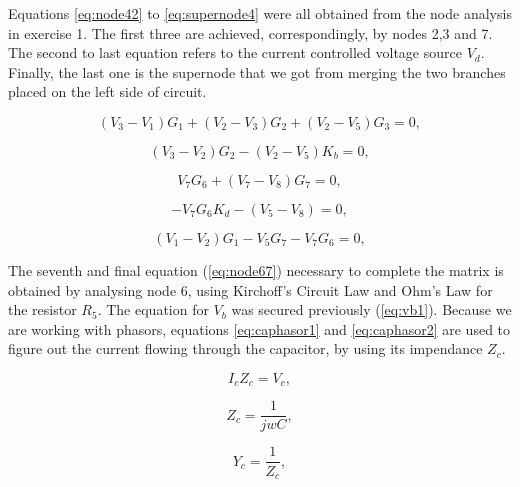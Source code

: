 Equations \ref{eq:node42} to \ref{eq:supernode4} were all obtained from the node analysis in exercise 1. The first three are achieved, correspondingly, by nodes 2,3 and 7. The second to last equation refers to the current controlled voltage source $V_d$. Finally, the last one is the supernode that we got from merging the two branches placed on the left side of circuit.

\begin{equation}
  (V_{3} - V_{1})G_{1} + (V_{2} - V_{3})G_{2} + (V_{2} - V_{5})G_{3}= 0,
  \label{eq:node42}
\end{equation}

\begin{equation}
  (V_{3} - V_{2})G_{2} - (V_{2} - V_{5})K_{b} = 0,
  \label{eq:node43}
\end{equation}


\begin{equation}
  V_{7}G_{6} + (V_{7} - V_{8})G_{7} = 0,
  \label{eq:node47}
\end{equation}


\begin{equation}
  -V_{7}G_{6}K_{d} - (V_{5} - V_{8}) = 0,
  \label{eq:vd4}
\end{equation}

\begin{equation}
  (V_{1} - V_{2})G_{1} - V_{5}G_{7} - V_{7}G_{6} = 0,
  \label{eq:supernode4}
\end{equation}

The seventh and final equation (\ref{eq:node67}) necessary to complete the matrix is obtained by analysing node 6, using Kirchoff's Circuit Law and Ohm's Law for the resistor $R_5$. The equation for $V_b$ was secured previously (\ref{eq:vb1}). Because we are working with phasors, equations \ref{eq:caphasor1} and \ref{eq:caphasor2} are used to figure out the current flowing through the capacitor, by using its impendance $Z_c$.

\begin{equation}
  I_{c}Z_{c} = V_{c},
  \label{eq:caphasor1}
\end{equation}

\begin{equation}
  Z_{c} = \frac{1}{jwC},
  \label{eq:impedancecap}
\end{equation}

\begin{equation}
 Y_{c} = \frac{1}{Z_c},
  \label{eq:caphasor2}
\end{equation}

